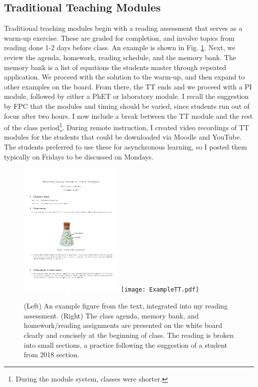 \documentclass[../../../main.tex]{subfiles}
\begin{document}
\subsection{Traditional Teaching Modules}
\label{sec:tt}

Traditional teaching modules begin with a reading assessment that serves as a warm-up exercise.  These are graded for completion, and involve topics from reading done 1-2 days before class.  An example is shown in Fig. \ref{fig:read}.  Next, we review the agenda, homework, reading schedule, and the memory bank.  The memory bank is a list of equations the students master through repeated application.  We proceed with the solution to the warm-up, and then expand to other examples on the board.  From there, the TT ends and we proceed with a PI module, followed by either a PhET or laboratory module.  I recall the suggestion by FPC that the modules and timing should be varied, since students run out of focus after two hours.  I now include a break between the TT module and the rest of the class period\footnote{During the module system, classes were shorter.}.  During remote instruction, I created video recordings of TT modules for the students that could be downloaded via Moodle and YouTube.  The students preferred to use these for asynchronous learning, so I posted them typically on Fridays to be discussed on Mondays.

\begin{figure}
\centering
\includegraphics[width=0.45\textwidth]{figures/readingassessment.png}
\texttt{[image: ExampleTT.pdf]}
\caption{\label{fig:read} (Left) An example figure from the text, integrated into my reading assessment.  (Right) The class agenda, memory bank, and homework/reading assignments are presented on the white board clearly and concisely at the beginning of class.  The reading is broken into small sections, a practice following the suggestion of a student from 2018 section.}
\end{figure}
\end{document}
